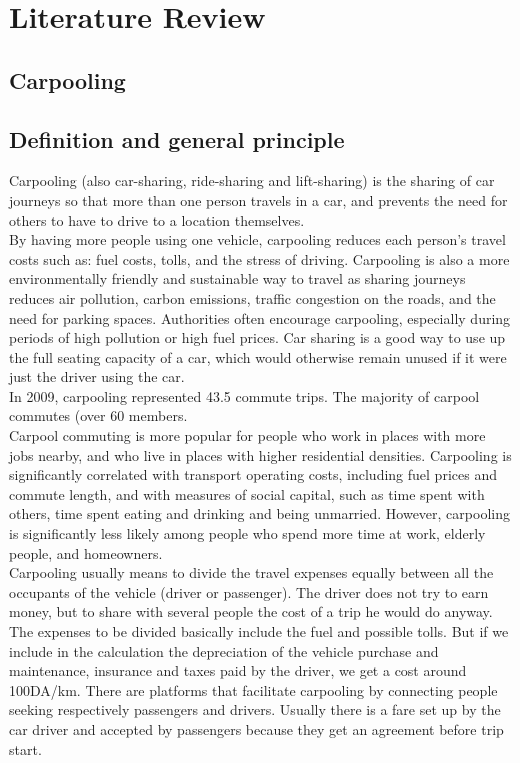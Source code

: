 \chapter{Literature Review} \label{chap:literatureReview}


\section*{}
\section*{Carpooling}
\section{Definition and general principle}
Carpooling (also car-sharing, ride-sharing and lift-sharing) is the sharing of car journeys       so that more than one person travels in a car, and prevents the need for others to have to drive to a location themselves.
\\ By having more people using one vehicle, carpooling reduces each person's travel costs 
such as: fuel costs, tolls, and the stress of driving. Carpooling is also a more environmentally 
friendly and sustainable way to travel as sharing journeys reduces air pollution, carbon 
emissions, traffic congestion on the roads, and the need for parking spaces. Authorities 
often encourage carpooling, especially during periods of high pollution or high fuel prices.
Car sharing is a good way to use up the full seating capacity of a car, which would otherwise 
remain unused if it were just the driver using the car.
\\ In 2009, carpooling represented 43.5%
commute trips. The majority of carpool commutes (over 60%
members.
\\ Carpool commuting is more popular for people who work in places with more jobs 
nearby, and who live in places with higher residential densities. Carpooling is significantly 
correlated with transport operating costs, including fuel prices and commute length, and 
with measures of social capital, such as time spent with others, time spent eating and 
drinking and being unmarried. However, carpooling is significantly less likely among 
people who spend more time at work, elderly people, and homeowners. 
\\ Carpooling usually means to divide the travel expenses equally between all the 
occupants of the vehicle (driver or passenger). The driver does not try to earn money, but 
to share with several people the cost of a trip he would do anyway. The expenses to be 
divided basically include the fuel and possible tolls. But if we include in the calculation the 
depreciation of the vehicle purchase and maintenance, insurance and taxes paid by the 
driver, we get a cost around 100DA/km. There are platforms that facilitate carpooling by 
connecting people seeking respectively passengers and drivers. Usually there is a fare set 
up by the car driver and accepted by passengers because they get an agreement before trip 
start.

